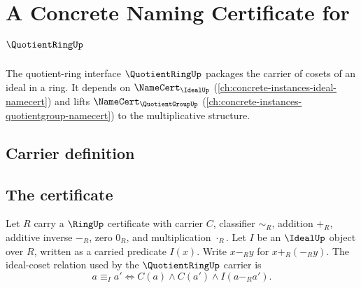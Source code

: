 \chapter{A Concrete Naming Certificate for $\QuotientRingUp$}
\label{ch:concrete-instances-quotientring-namecert}

The quotient-ring interface $\QuotientRingUp$ packages the carrier of cosets of an ideal in a ring. It depends on $\NameCert_{\IdealUp}$ (\autoref{ch:concrete-instances-ideal-namecert}) and lifts $\NameCert_{\QuotientGroupUp}$ (\autoref{ch:concrete-instances-quotientgroup-namecert}) to the multiplicative structure.

\section{Carrier definition}
\label{sec:quotientring-carrier}

\section{The certificate}
\label{sec:quotientring-certificate}

\begin{definition}
\label{def:quotientring-ideal-coset-relation}
Let $R$ carry a $\RingUp$ certificate with carrier $C$, classifier $\sim_R$, addition $+_R$, additive inverse $-_R$, zero $0_R$, and multiplication $\cdot_R$. Let $I$ be an $\IdealUp$ object over $R$, written as a carried predicate $I(x)$. Write $x-_R y$ for $x+_R(-_R y)$. The ideal-coset relation used by the $\QuotientRingUp$ carrier is
$$
a\equiv_I a'\Longleftrightarrow C(a)\land C(a')\land I(a-_R a').
$$
\end{definition}

